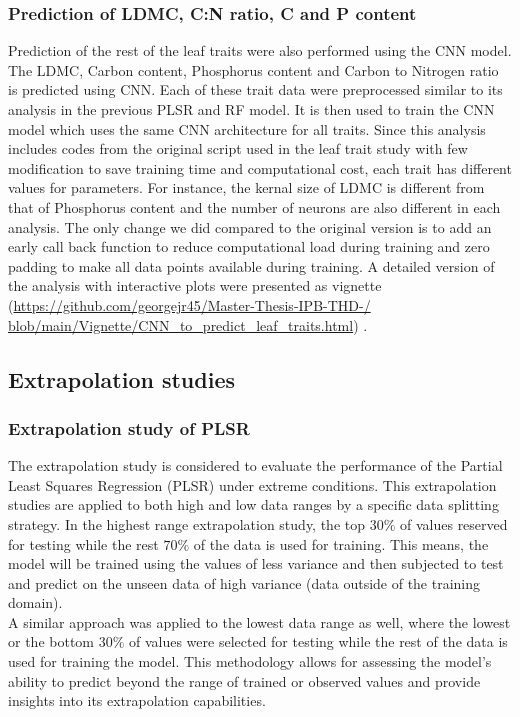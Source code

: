 \documentclass[12pt,a4paper]{report}
\begin{document}
\subsubsection*{Prediction of LDMC, C:N ratio, C and P content}
Prediction of the rest of the leaf traits were also performed using the CNN model. The LDMC, Carbon content, Phosphorus content and Carbon to Nitrogen ratio is predicted using CNN. Each of these trait data were preprocessed similar to its analysis in the previous PLSR and RF model. It is then used to train the CNN model which uses the same CNN architecture for all traits. Since this analysis includes codes from the original script used in the leaf trait study with few modification to save training time and computational cost, each trait has different values for parameters. For instance, the kernal size of LDMC is different from that of Phosphorus content and the number of neurons are also different in each analysis. The only change we did compared to the original version is to add an early call back function to reduce computational load during training and zero padding to make all data points available during training. A detailed version of the analysis with interactive plots were presented as vignette (\url{https://github.com/georgejr45/Master-Thesis-IPB-THD-/
blob/main/Vignette/CNN_to_predict_leaf_traits.html}) . \\


\subsection{Extrapolation studies }
\subsubsection*{Extrapolation study of PLSR}
The extrapolation study is considered to evaluate the performance of the Partial Least Squares Regression (PLSR) under extreme conditions. This extrapolation studies are applied to both high and low data ranges by a specific data splitting strategy. In the highest range extrapolation study, the top $30\%$ of values reserved for testing while the rest $70\%$ of the data is used for training. This means, the model will be trained using the values of less variance and then subjected to test and predict on the unseen data of high variance (data outside of the training domain).\\

A similar approach was applied to the lowest data range as well, where the lowest or the bottom $30\%$ of values were selected for testing while the rest of the data is used for training the model. This methodology allows for assessing the model's ability to predict beyond the range of trained or observed values and provide insights into its extrapolation capabilities.\\
\end{document}
